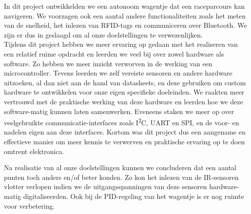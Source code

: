 In dit project ontwikkelden we een autonoom wagentje dat een raceparcours kan navigeren. We voorzagen ook een aantal andere functionaliteiten zoals het meten van de snelheid, het inlezen van RFID-tags en communiceren over Bluetooth. We zijn er dus in geslaagd om al onze doelstellingen te verwezenlijken.\\
Tijdens dit project hebben we meer ervaring op gedaan met het realiseren van een relatief ruime opdracht en leerden we veel bij over zowel hardware als software. Zo hebben we meer inzicht verworven in de werking van een microcontroller. Tevens leerden we zelf vereiste sensoren en andere hardware uitzoeken, al dan niet aan de hand van datasheets, en deze gebruiken om custom hardware te ontwikkelen voor onze eigen specifieke doeleinden. We raakten meer vertrouwd met de praktische werking van deze hardware en leerden hoe we deze software-matig kunnen laten samenwerken. Eveneens staken we meer op over veelgebruikte communicatie-interfaces zoals I\textsuperscript{2}C, UART en SPI, en de voor- en nadelen eigen aan deze interfaces. Kortom was dit project dus een aangename en effectieve manier om meer kennis te verwerven en praktische ervaring op te doen omtrent elektronica.

Na realisatie van al onze doelstellingen kunnen we concluderen dat een aantal punten toch anders en/of beter konden. Zo kon het inlezen van de IR-sensoren vlotter verlopen indien we de uitgangsspanningen van deze sensoren hardware-matig digitaliseerden. Ook bij de PID-regeling van het wagentje is er nog ruimte voor verbetering.